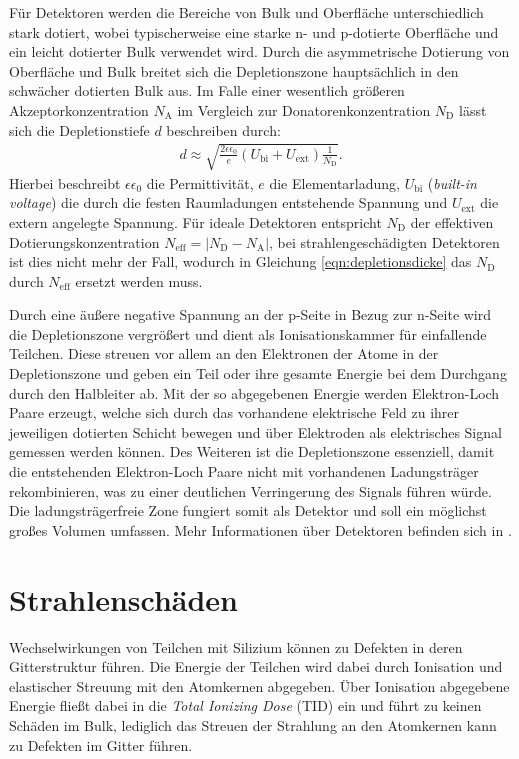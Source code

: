 Für Detektoren werden die Bereiche von Bulk und Oberfläche unterschiedlich stark dotiert, wobei typischerweise eine starke n- und
p-dotierte Oberfläche und ein leicht dotierter Bulk verwendet wird. Durch die asymmetrische
Dotierung von Oberfläche und Bulk breitet sich die Depletionszone hauptsächlich in den schwächer dotierten Bulk aus.
Im Falle einer wesentlich größeren Akzeptorkonzentration $N_{\mathrm{A}}$
im Vergleich zur Donatorenkonzentration $N_{\mathrm{D}}$ lässt sich die Depletionstiefe $d$ beschreiben durch:
\begin{align}
  d \approx \sqrt{\frac{2 \epsilon \epsilon_0}{e} (U_{\mathrm{bi}}+U_{\mathrm{ext}})\frac{1}{N_{\mathrm{D}}}}.
  \label{eqn:depletionsdicke}
\end{align}
Hierbei beschreibt $\epsilon \epsilon_0$ die Permittivität, $e$ die Elementarladung, $U_{\mathrm{bi}}$ (\textit{built-in voltage})  die
durch die festen Raumladungen entstehende Spannung und $U_{\mathrm{ext}}$ die extern angelegte Spannung. Für ideale Detektoren entspricht $N_{\mathrm{D}}$ der effektiven Dotierungskonzentration $N_{\mathrm{eff}}=|N_{\mathrm{D}}-N_{\mathrm{A}}|$, bei
strahlengeschädigten Detektoren ist dies nicht mehr der Fall, wodurch in Gleichung \ref{eqn:depletionsdicke} das $N_{\mathrm{D}}$ durch $N_{\mathrm{eff}}$ ersetzt werden muss.


Durch eine äußere negative Spannung  an der p-Seite in Bezug zur n-Seite wird die Depletionszone vergrößert und dient als Ionisationskammer für einfallende Teilchen. Diese streuen vor allem
an den Elektronen der Atome in der Depletionszone und geben ein Teil oder ihre gesamte Energie bei dem Durchgang durch den Halbleiter ab. Mit der so abgegebenen
Energie werden Elektron-Loch Paare erzeugt, welche sich durch das vorhandene elektrische Feld zu ihrer jeweiligen dotierten
Schicht bewegen und über Elektroden als elektrisches Signal gemessen werden können. Des Weiteren ist die Depletionszone essenziell, damit
die entstehenden Elektron-Loch Paare nicht mit vorhandenen Ladungsträger rekombinieren, was zu einer deutlichen Verringerung des Signals führen würde.
Die ladungsträgerfreie Zone fungiert somit als Detektor und soll ein möglichst großes Volumen umfassen.
Mehr Informationen über Detektoren befinden sich in  \cite{semiconductor}.

\section{Strahlenschäden}
Wechselwirkungen von Teilchen mit Silizium können zu Defekten in deren
Gitterstruktur führen.
Die Energie der Teilchen wird dabei durch Ionisation und elastischer Streuung mit den Atomkernen abgegeben. Über Ionisation abgegebene Energie
fließt dabei in die
\textit{Total Ionizing Dose} (TID) ein und führt zu keinen Schäden im Bulk, lediglich das Streuen der Strahlung an den
Atomkernen kann zu Defekten im Gitter führen.

